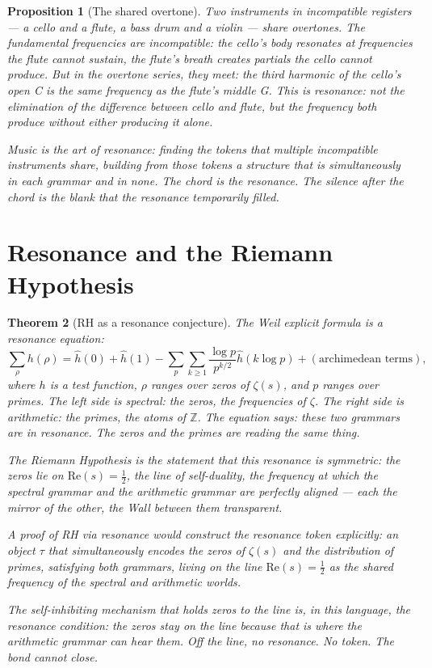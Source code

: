 \documentclass[12pt]{article}
\newtheorem{theorem}{Theorem}
\newtheorem{proposition}[theorem]{Proposition}
\theoremstyle{definition}
\theoremstyle{remark}
\begin{document}
\begin{proposition}[The shared overtone]
Two instruments in incompatible registers --- a cello and a flute,
a bass drum and a violin --- share overtones.
The fundamental frequencies are incompatible:
the cello's body resonates at frequencies the flute cannot sustain,
the flute's breath creates partials the cello cannot produce.
But in the overtone series, they meet:
the third harmonic of the cello's open C
is the same frequency as the flute's middle G.
This is resonance: not the elimination of the difference
between cello and flute, but the frequency both produce
without either producing it alone.

Music is the art of resonance:
finding the tokens that multiple incompatible instruments share,
building from those tokens a structure that is simultaneously
in each grammar and in none.
The chord is the resonance.
The silence after the chord is the blank
that the resonance temporarily filled.
\end{proposition}

\section{Resonance and the Riemann Hypothesis}

\begin{theorem}[RH as a resonance conjecture]
\label{thm:rh}
The Weil explicit formula is a resonance equation:
\[
\sum_\rho h(\rho) = \hat h(0) + \hat h(1)
- \sum_p \sum_{k \geq 1} \frac{\log p}{p^{k/2}} \hat h(k \log p)
+ (\text{archimedean terms}),
\]
where $h$ is a test function, $\rho$ ranges over zeros of $\zeta(s)$,
and $p$ ranges over primes.
The left side is spectral: the zeros, the frequencies of $\zeta$.
The right side is arithmetic: the primes, the atoms of $\mathbb{Z}$.
The equation says: these two grammars are in resonance.
The zeros and the primes are reading the same thing.

The Riemann Hypothesis is the statement that this resonance
is \emph{symmetric}: the zeros lie on $\mathrm{Re}(s) = \tfrac{1}{2}$,
the line of self-duality, the frequency at which the spectral grammar
and the arithmetic grammar are perfectly aligned ---
each the mirror of the other, the Wall between them transparent.

A proof of RH via resonance would construct the resonance token explicitly:
an object $\tau$ that simultaneously encodes
the zeros of $\zeta(s)$ and the distribution of primes,
satisfying both grammars, living on the line $\mathrm{Re}(s) = \tfrac{1}{2}$
as the shared frequency of the spectral and arithmetic worlds.

The self-inhibiting mechanism \cite{inhibition} that holds zeros to the line
is, in this language, the resonance condition:
the zeros stay on the line because that is where
the arithmetic grammar can hear them.
Off the line, no resonance. No token.
The bond cannot close.
\end{theorem}
\end{document}
